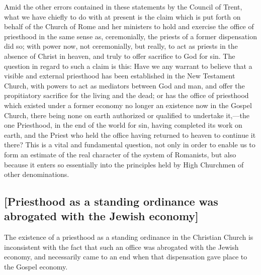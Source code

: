 \documentclass[
  english,
]{book}
\begin{document}
Amid the other errors contained in these statements by the Council of Trent, what we have chiefly to do with at present is the claim which is put forth on behalf of the Church of Rome and her ministers to hold and exercise the office of priesthood in the same sense as, ceremonially, the priests of a former dispensation did so; with power now, not ceremonially, but really, to act as priests in the absence of Christ in heaven, and truly to offer sacrifice to God for sin. The question in regard to such a claim is this: Have we any warrant to believe that a visible and external priesthood has been established in the New Testament Church, with powers to act as mediators between God and man, and offer the propitiatory sacrifice for the living and the dead; or has the office of priesthood which existed under a former economy no longer an existence now in the Gospel Church, there being none on earth authorized or qualified to undertake it,---the one Priesthood, in the end of the world for sin, having completed its work on earth, and the Priest who held the office having returned to heaven to continue it there? This is a vital and fundamental question, not only in order to enable us to form an estimate of the real character of the system of Romanists, but also because it enters so essentially into the principles held by High Churchmen of other denominations.

\hypertarget{priesthood-as-a-standing-ordinance-was-abrogated-with-the-jewish-economy}{%
\subsection{{[}Priesthood as a standing ordinance was abrogated with the Jewish economy{]}}\label{priesthood-as-a-standing-ordinance-was-abrogated-with-the-jewish-economy}}

The existence of a priesthood as a standing ordinance in the Christian Church is inconsistent with the fact that such an office was abrogated with the Jewish economy, and necessarily came to an end when that dispensation gave place to the Gospel economy.
\end{document}
